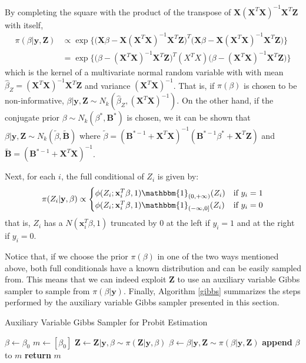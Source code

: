 \documentclass{article}
\newcommand{\IF}[2]{\mathbbm{1}_{#1}(#2)} %
\renewcommand{\vec}[1]{\mathbf{#1}}
\begin{document}
By completing the square with the product of the transpose of \(\vec{X} (\vec{X}^T \vec{X})^{-1}\vec{X}^T \vec{Z}\) with itself,
\begin{align*}
    \pi(\beta|\vec{y}, \vec{Z}) &\propto \exp\Big\{\big(\vec{X}\beta - \vec{X} (\vec{X}^T \vec{X})^{-1}\vec{X}^T \vec{Z}\big)^T\big(\vec{X}\beta - \vec{X} (\vec{X}^T \vec{X})^{-1}\vec{X}^T \vec{Z}\big)\Big\} \\
    &= \exp\Big\{\big(\beta - (\vec{X}^T \vec{X})^{-1}\vec{X}^T \vec{Z}\big)^T (X^T X) \big(\beta - (\vec{X}^T \vec{X})^{-1}\vec{X}^T \vec{Z}\big)\Big\}
\end{align*}
which is the kernel of a multivariate normal random variable with with mean \(\hat{\beta}_Z = (\vec{X}^T \vec{X})^{-1}\vec{X}^T \vec{Z}\) and variance \((\vec{X}^T \vec{X})^{-1}\). That is, if \(\pi(\beta)\) is chosen to be non-informative, \(\beta|\vec{y}, \vec{Z} \sim N_k(\hat{\beta}_Z, (\vec{X}^T\vec{X})^{-1})\). On the other hand, if the conjugate prior \(\beta \sim N_k(\beta^*, \vec{B}^*)\) is chosen, we it can be shown that \(\beta | \vec{y}, \vec{Z} \sim N_k(\tilde{\beta}, \tilde{\vec{B}})\) where \(\tilde{\beta} = (\vec{B}^{*-1} + \vec{X}^T\vec{X})^{-1}(\vec{B}^{*-1}\beta^* + \vec{X}^T\vec{Z})\) and \(\tilde{\vec{B}} = (\vec{B}^{*-1} + \vec{X}^T\vec{X})^{-1}\). 
\par
Next, for each \(i\), the full conditional of \(Z_i\) is given by:
\begin{equation*}
    \pi(Z_i | \vec{y}, \beta) \propto 
    \begin{cases}
        \phi(Z_i; \vec{x}_i^T \beta, 1) \IF{(0, +\infty)}{Z_i} & \text{if } y_i = 1 \\
        \phi(Z_i; \vec{x}_i^T \beta, 1) \IF{(-\infty, 0]}{Z_i} & \text{if } y_i = 0
    \end{cases}
\end{equation*}
that is, \(Z_i\) has a \(N(\vec{x}_i^T \beta, 1)\) truncated by 0 at the left if \(y_i = 1\) and at the right if \(y_i = 0\).
\par 
Notice that, if we choose the prior \(\pi(\beta)\) in one of the two ways mentioned above, both full conditionals have a known distribution and can be easily sampled from. This means that we can indeed exploit \(\vec{Z}\) to use an auxiliary variable Gibbs sampler to sample from \(\pi(\beta|\vec{y})\). Finally, Algorithm \ref{gibbs} summarizes the steps performed by the auxiliary variable Gibbs sampler presented in this section.

\begin{algorithm}
\caption{Auxiliary Variable Gibbs Sampler for Probit Estimation}\label{gibbs}
\begin{algorithmic}[1]
    \State $\beta \gets \beta_0$
    \State $m \gets [\beta_0]$
    \Repeat
        \State $\vec{Z} \gets \vec{Z} | \vec{y}, \beta \sim \pi(\vec{Z}|\vec{y}, \beta)$
        \State $\beta \gets \beta | \vec{y}, \vec{Z} \sim \pi(\beta | \vec{y}, \vec{Z})$
        \State \textbf{append} $\beta$ to $m$
    \State \textbf{return} $m$
\EndProcedure
\end{algorithmic}
\end{algorithm}
\end{document}
